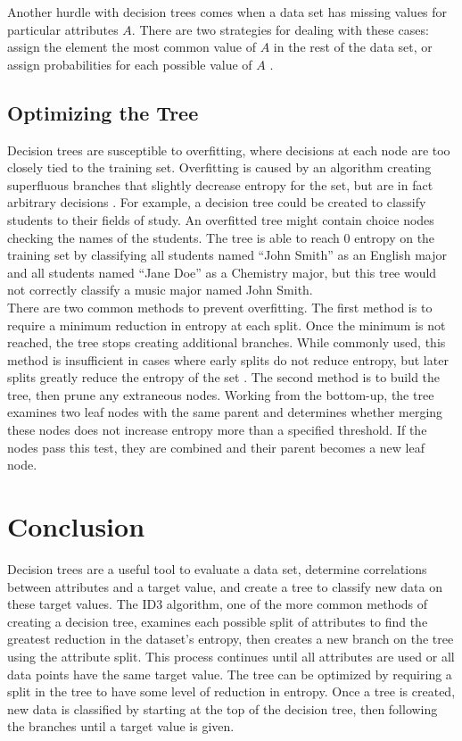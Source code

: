 Another hurdle with decision trees comes when a data set has missing values for particular attributes $A$. There are two strategies for dealing with these cases: assign the element the most common value of $A$ in the rest of the data set, or assign probabilities for each possible value of $A$ \cite{mitc97}. 

\subsection{Optimizing the Tree}
Decision trees are susceptible to overfitting, where decisions at each node are too closely tied to the training set. Overfitting is caused by an algorithm creating superfluous branches that slightly decrease entropy for the set, but are in fact arbitrary decisions \cite{sega07}. For example, a decision tree could be created to classify students to their fields of study. An overfitted tree might contain choice nodes checking the names of the students. The tree is able to reach 0 entropy on the training set by classifying all students named ``John Smith'' as an English major and all students named ``Jane Doe'' as a Chemistry major, but this tree would not correctly classify a music major named John Smith.\\

There are two common methods to prevent overfitting. The first method is to require a minimum reduction in entropy at each split. Once the minimum is not reached, the tree stops creating additional branches. While commonly used, this method is insufficient in cases where early splits do not reduce entropy, but later splits greatly reduce the entropy of the set \cite{sega07}. The second method is to build the tree, then prune any extraneous nodes. Working from the bottom-up, the tree examines two leaf nodes with the same parent and determines whether merging these nodes does not increase entropy more than a specified threshold. If the nodes pass this test, they are combined and their parent becomes a new leaf node.\\

\section{Conclusion}
Decision trees are a useful tool to evaluate a data set, determine correlations between attributes and a target value, and create a tree to classify new data on these target values. The ID3 algorithm, one of the more common methods of creating a decision tree, examines each possible split of attributes to find the greatest reduction in the dataset's entropy, then creates a new branch on the tree using the attribute split. This process continues until all attributes are used or all data points have the same target value. The tree can be optimized by requiring a split in the tree to have some level of reduction in entropy. Once a tree is created, new data is classified by starting at the top of the decision tree, then following the branches until a target value is given.
